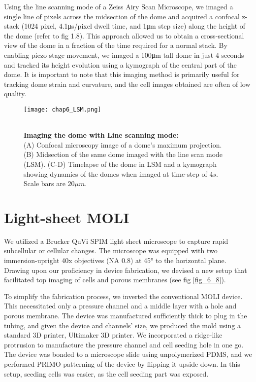 Using the line scanning mode of a Zeiss Airy Scan Microscope, we imaged a single line of pixels across the midsection of the dome and acquired a confocal z-stack (1024 pixel, 4.1\unit{\us/pixel} dwell time, and 1\unit{\um} step size) along the height of the dome (refer to fig 1.8). This approach allowed us to obtain a cross-sectional view of the dome in a fraction of the time required for a normal stack. By enabling piezo stage movement, we imaged a 100\unit{\um} tall dome in just 4 seconds and tracked its height evolution using a kymograph of the central part of the dome. It is important to note that this imaging method is primarily useful for tracking dome strain and curvature, and the cell images obtained are often of low quality.

\begin{figure}[t!]
	\begin{minipage}[c]{0.6\textwidth}
		\texttt{[image: chap6\_LSM.png]}
	\end{minipage}\hfill
	\begin{minipage}[c]{0.35\textwidth}
		\caption{\\ \textbf{Imaging the dome with Line scanning mode:}\\ (A) Confocal microscopy image of a dome's maximum projection. (B) Midsection of the same dome imaged with the line scan mode (LSM). (C-D) Timelapse of the dome in LSM and a kymograph showing dynamics of the domes when imaged at time-step of $4s$. Scale bars are $20 \mu m$.
		} \label{fig_6_7}
	\end{minipage}
\end{figure}

\hypertarget{light-sheet-moli}{%
\section{Light-sheet MOLI}\label{light-sheet-moli}}

We utilized a Brucker QuVi SPIM light sheet microscope to capture rapid subcellular or cellular changes. The microscope was equipped with two immersion-upright 40x objectives (NA 0.8) at 45\unit{\degree} to the horizontal plane. Drawing upon our proficiency in device fabrication, we devised a new setup that facilitated top imaging of cells and porous membranes (see fig \ref{fig_6_8}).

To simplify the fabrication process, we inverted the conventional MOLI device. This necessitated only a pressure channel and a middle layer with a hole and porous membrane. The device was manufactured sufficiently thick to plug in the tubing, and given the device and channels' size, we produced the mold using a standard 3D printer, Ultimaker 3D printer. We incorporated a ridge-like protrusion to manufacture the pressure channel and cell seeding hole in one go. The device was bonded to a microscope slide using unpolymerized PDMS, and we performed PRIMO patterning of the device by flipping it upside down. In this setup, seeding cells was easier, as the cell seeding part was exposed.

